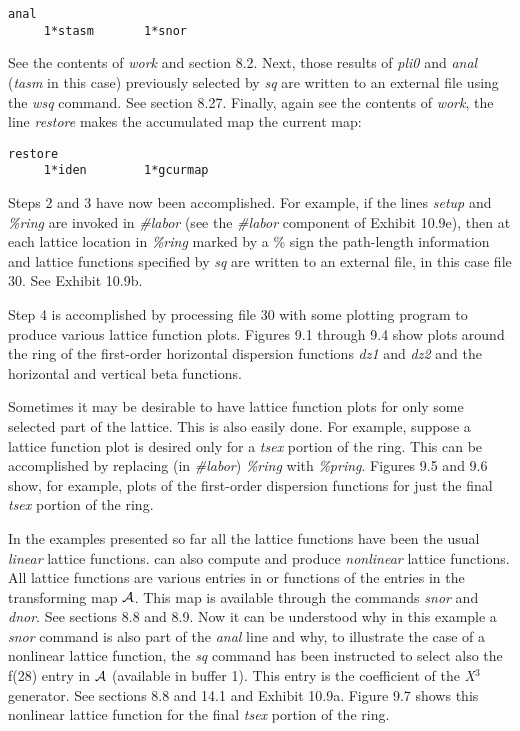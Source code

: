 \begin{footnotesize}
\begin{verbatim}
anal
     1*stasm       1*snor
\end{verbatim}
\end{footnotesize}
See the contents of {\em work} and section 8.2.  Next, those results of
{\em pli0} and {\em anal} ({\em tasm} in this case) previously selected by {\em sq} are
written to an external file using the {\em wsq} command.  See section
8.27.  Finally, again see the contents of {\em work}, the line {\em
restore} makes the accumulated map the current map:

\begin{footnotesize}
\begin{verbatim}
restore
     1*iden        1*gcurmap
\end{verbatim}
\end{footnotesize}
Steps 2 and 3 have now been accomplished.  For example, if the lines {\em setup}
and {\em \%ring} are invoked in {\em \#labor} (see the {\em \#labor}
component of Exhibit 10.9e), then at each lattice location in {\em \%ring}
marked by a \% sign the path-length information and lattice functions specified by {\em sq} are
written to an external file, in this case file 30.  See Exhibit 10.9b.

Step 4 is accomplished by processing file 30 with some plotting program to produce
various lattice function plots.  Figures 9.1 through 9.4 show plots around
the ring of the first-order horizontal dispersion functions {\em dz1} and
{\em dz2} and the
horizontal and vertical beta functions.

Sometimes it may be desirable to have lattice function plots for only
some selected part of the lattice.  This is also easily done.  For
example, suppose a lattice function plot is desired only for a {\em tsex}
portion of the ring.  This can be accomplished by replacing (in {\em \#labor})
{\em \%ring} with {\em \%pring}.  Figures 9.5 and 9.6 show, for example, plots of the
first-order dispersion functions for just the final {\em tsex} portion of
the ring.

In the examples presented so far all the lattice functions have been the
usual {\em linear} lattice functions.  \Mary can
also compute and produce {\em nonlinear} lattice functions.  All lattice
functions are various entries in or functions of the entries in the transforming map ${\cal A}$.  This
map is available through the commands {\em snor} and {\em dnor}.  See
sections 8.8 and 8.9.  Now it can be understood why in this example a {\em snor} command
is also part of the {\em anal} line and why, to illustrate the case of a
nonlinear lattice function, the {\em sq} command has been instructed to
select also the f(28) entry in ${\cal A}$ (available in buffer 1).  This
entry is
the coefficient of the {\em X$^3$} generator.  See sections 8.8 and 14.1 and
Exhibit 10.9a.  Figure 9.7 shows this nonlinear lattice function for the final {\em
tsex} portion of the ring.

